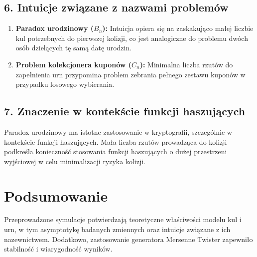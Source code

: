 \documentclass{article}
\begin{document}
\subsection*{6. Intuicje związane z nazwami problemów}
\begin{enumerate}
    \item \textbf{Paradox urodzinowy ($B_n$):} Intuicja opiera się na zaskakująco małej liczbie kul potrzebnych do pierwszej kolizji, co jest analogiczne do problemu dwóch osób dzielących tę samą datę urodzin.
    \item \textbf{Problem kolekcjonera kuponów ($C_n$):} Minimalna liczba rzutów do zapełnienia urn przypomina problem zebrania pełnego zestawu kuponów w przypadku losowego wybierania.
\end{enumerate}

\subsection*{7. Znaczenie w kontekście funkcji haszujących}
Paradox urodzinowy ma istotne zastosowanie w kryptografii, szczególnie w kontekście funkcji haszujących. Mała liczba rzutów prowadząca do kolizji podkreśla konieczność stosowania funkcji haszujących o dużej przestrzeni wyjściowej w celu minimalizacji ryzyka kolizji.

\section{Podsumowanie}
Przeprowadzone symulacje potwierdzają teoretyczne właściwości modelu kul i urn, w tym asymptotykę badanych zmiennych oraz intuicje związane z ich nazewnictwem. Dodatkowo, zastosowanie generatora Mersenne Twister zapewniło stabilność i wiarygodność wyników.

\pagebreak
\end{document}
